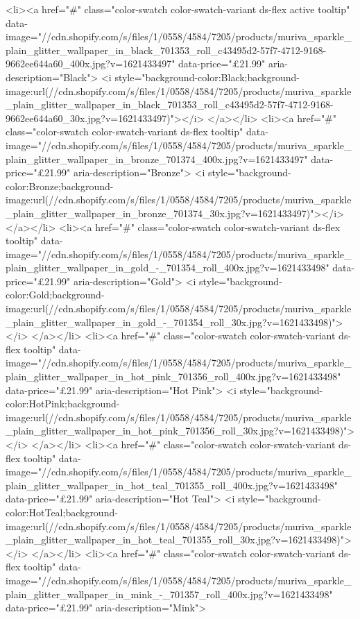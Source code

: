 {{{{{{{<li><a href="#" class="color-swatch color-swatch-variant ds-flex active tooltip" data-image="//cdn.shopify.com/s/files/1/0558/4584/7205/products/muriva_sparkle_plain_glitter_wallpaper_in_black_701353_roll_c43495d2-57f7-4712-9168-9662ee644a60_400x.jpg?v=1621433497" data-price="£21.99" aria-description="Black">
              <i style="background-color:Black;background-image:url(//cdn.shopify.com/s/files/1/0558/4584/7205/products/muriva_sparkle_plain_glitter_wallpaper_in_black_701353_roll_c43495d2-57f7-4712-9168-9662ee644a60_30x.jpg?v=1621433497)"></i>
            </a></li>
<li><a href="#" class="color-swatch color-swatch-variant ds-flex tooltip" data-image="//cdn.shopify.com/s/files/1/0558/4584/7205/products/muriva_sparkle_plain_glitter_wallpaper_in_bronze_701374_400x.jpg?v=1621433497" data-price="£21.99" aria-description="Bronze">
              <i style="background-color:Bronze;background-image:url(//cdn.shopify.com/s/files/1/0558/4584/7205/products/muriva_sparkle_plain_glitter_wallpaper_in_bronze_701374_30x.jpg?v=1621433497)"></i>
            </a></li>
<li><a href="#" class="color-swatch color-swatch-variant ds-flex tooltip" data-image="//cdn.shopify.com/s/files/1/0558/4584/7205/products/muriva_sparkle_plain_glitter_wallpaper_in_gold_-_701354_roll_400x.jpg?v=1621433498" data-price="£21.99" aria-description="Gold">
              <i style="background-color:Gold;background-image:url(//cdn.shopify.com/s/files/1/0558/4584/7205/products/muriva_sparkle_plain_glitter_wallpaper_in_gold_-_701354_roll_30x.jpg?v=1621433498)"></i>
            </a></li>
<li><a href="#" class="color-swatch color-swatch-variant ds-flex tooltip" data-image="//cdn.shopify.com/s/files/1/0558/4584/7205/products/muriva_sparkle_plain_glitter_wallpaper_in_hot_pink_701356_roll_400x.jpg?v=1621433498" data-price="£21.99" aria-description="Hot Pink">
              <i style="background-color:HotPink;background-image:url(//cdn.shopify.com/s/files/1/0558/4584/7205/products/muriva_sparkle_plain_glitter_wallpaper_in_hot_pink_701356_roll_30x.jpg?v=1621433498)"></i>
            </a></li>
<li><a href="#" class="color-swatch color-swatch-variant ds-flex tooltip" data-image="//cdn.shopify.com/s/files/1/0558/4584/7205/products/muriva_sparkle_plain_glitter_wallpaper_in_hot_teal_701355_roll_400x.jpg?v=1621433498" data-price="£21.99" aria-description="Hot Teal">
              <i style="background-color:HotTeal;background-image:url(//cdn.shopify.com/s/files/1/0558/4584/7205/products/muriva_sparkle_plain_glitter_wallpaper_in_hot_teal_701355_roll_30x.jpg?v=1621433498)"></i>
            </a></li>
<li><a href="#" class="color-swatch color-swatch-variant ds-flex tooltip" data-image="//cdn.shopify.com/s/files/1/0558/4584/7205/products/muriva_sparkle_plain_glitter_wallpaper_in_mink_-_701357_roll_400x.jpg?v=1621433498" data-price="£21.99" aria-description="Mink">
}}}}}}}
